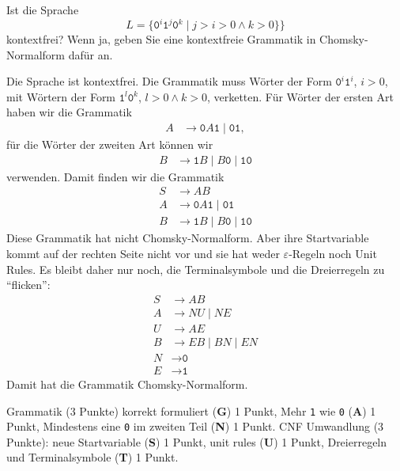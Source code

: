 Ist die Sprache
\[
L=
\{
\texttt{0}^i \texttt{1}^j\texttt{0}^k\;|\; j> i>0\wedge k>0\}
\}
\]
kontextfrei?
Wenn ja, geben Sie eine kontextfreie Grammatik in Chomsky-Normalform dafür an.


\begin{loesung}
Die Sprache ist kontextfrei.
Die Grammatik muss Wörter der Form $\texttt{0}^i\texttt{1}^i$, $i>0$, mit
Wörtern der Form $\texttt{1}^l\texttt{0}^k$, $l>0\wedge k>0$, verketten.
Für Wörter der ersten Art haben wir die Grammatik
\begin{align*}
A&\to \texttt{0}A\texttt{1} \;|\; \texttt{01},
\end{align*}
für die Wörter der zweiten Art können wir
\begin{align*}
B&\to \texttt{1} B \;|\; B\texttt{0} \;|\; \texttt{10}
\end{align*}
verwenden.
Damit finden wir die Grammatik
\begin{align*}
S&\to AB
\\
A&\to \texttt{0}A\texttt{1} \;|\; \texttt{01}
\\ 
B&\to \texttt{1}B \;|\; B\texttt{0} \;|\; \texttt{10}
\end{align*}
Diese Grammatik hat nicht Chomsky-Normalform.
Aber ihre Startvariable kommt auf der rechten Seite nicht vor und
sie hat weder $\varepsilon$-Regeln noch Unit Rules.
Es bleibt daher nur noch, die Terminalsymbole und die Dreierregeln
zu ``flicken'':
\begin{align*}
S&\to AB
\\
A&\to NU \;|\; NE
\\
U&\to AE
\\ 
B&\to EB \;|\; BN \;|\; EN
\\
N&\to \texttt{0}
\\
E&\to \texttt{1}
\end{align*}
Damit hat die Grammatik Chomsky-Normalform.
\end{loesung}

\begin{bewertung}
Grammatik (3 Punkte) korrekt formuliert ({\bf G}) 1 Punkt,
Mehr \texttt{1} wie \texttt{0} ({\bf A}) 1 Punkt,
Mindestens eine \texttt{0} im zweiten Teil ({\bf N}) 1 Punkt.
CNF Umwandlung (3 Punkte): neue Startvariable ({\bf S}) 1 Punkt,
unit rules ({\bf U}) 1 Punkt,
Dreierregeln und Terminalsymbole ({\bf T}) 1 Punkt.
\end{bewertung}
